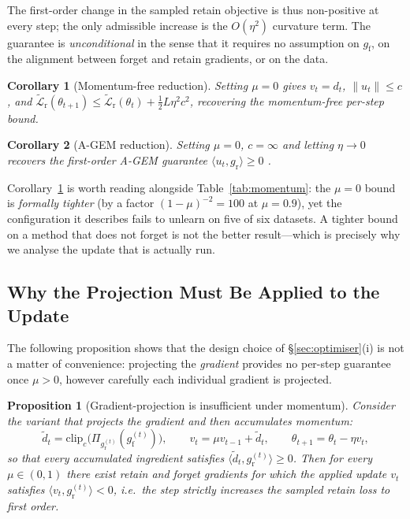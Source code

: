 \documentclass{article}
\newcommand{\gf}{g_{\mathrm{f}}}
\newcommand{\gr}{g_{\mathrm{r}}}
\newcommand{\Lrt}{\widetilde{\mathcal{L}}_{\mathrm{r}}}
\newtheorem{proposition}{Proposition}
\newtheorem{corollary}{Corollary}
\theoremstyle{remark}
\theoremstyle{plain}
\begin{document}
The first-order change in the sampled retain objective is thus non-positive at
every step; the only admissible increase is the $O(\eta^2)$ curvature term. The
guarantee is \emph{unconditional} in the sense that it requires no assumption on
$\gf$, on the alignment between forget and retain gradients, or on the data.

\begin{corollary}[Momentum-free reduction]\label{cor:mu0}
Setting $\mu=0$ gives $v_t = d_t$, $\|u_t\|\le c$, and
$\Lrt(\theta_{t+1}) \le \Lrt(\theta_t) + \tfrac{1}{2}L\eta^2c^2$, recovering the
momentum-free per-step bound.
\end{corollary}

\begin{corollary}[A-GEM reduction]\label{cor:agem}
Setting $\mu=0$, $c=\infty$ and letting $\eta\to0$ recovers the first-order
A-GEM guarantee $\langle u_t,\gr\rangle\ge0$ \citep{chaudhry2019agem}.
\end{corollary}

Corollary~\ref{cor:mu0} is worth reading alongside
Table~\ref{tab:momentum}: the $\mu=0$ bound is \emph{formally tighter} (by a
factor $(1-\mu)^{-2}=100$ at $\mu=0.9$), yet the configuration it describes
fails to unlearn on five of six datasets. A tighter bound on a method that does
not forget is not the better result---which is precisely why we analyse the
update that is actually run.

\subsection{Why the Projection Must Be Applied to the Update}\label{app:counterexample}

The following proposition shows that the design choice of
\S\ref{sec:optimiser}(i) is not a matter of convenience: projecting the
\emph{gradient} provides no per-step guarantee once $\mu>0$, however carefully
each individual gradient is projected.

\begin{proposition}[Gradient-projection is insufficient under momentum]\label{prop:counter}
Consider the variant that projects the gradient and then accumulates momentum:
\[
\tilde d_t = \mathrm{clip}_c\big(\Pi_{\gr^{(t)}}(\gf^{(t)})\big), \qquad
v_t = \mu v_{t-1} + \tilde d_t, \qquad \theta_{t+1} = \theta_t - \eta v_t ,
\]
so that every accumulated ingredient satisfies
$\langle \tilde d_t, \gr^{(t)}\rangle \ge 0$. Then for every $\mu \in (0,1)$
there exist retain and forget gradients for which the applied update $v_t$
satisfies $\langle v_t, \gr^{(t)}\rangle < 0$, i.e.\ the step strictly increases
the sampled retain loss to first order.
\end{proposition}
\end{document}
